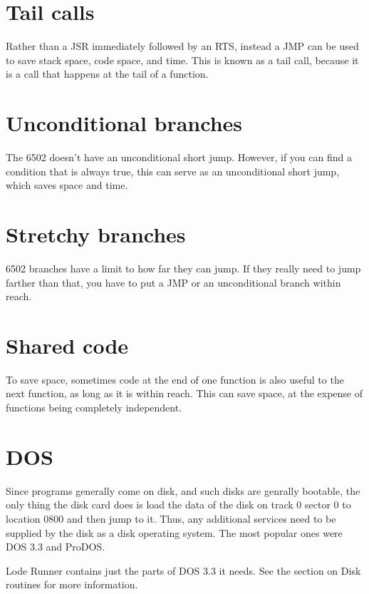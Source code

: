 \documentclass[10pt]{report}%
\begin{document}
\section{Tail calls}

Rather than a {\Tt{}JSR\nwendquote} immediately followed by an {\Tt{}RTS\nwendquote}, instead a {\Tt{}JMP\nwendquote}
can be used to save stack space, code space, and time. This is known as a
tail call, because it is a call that happens at the tail of a function.

\section{Unconditional branches}

The 6502 doesn't have an unconditional short jump. However, if you can find
a condition that is always true, this can serve as an unconditional short
jump, which saves space and time.

\section{Stretchy branches}

6502 branches have a limit to how far they can jump. If they really need to
jump farther than that, you have to put a {\Tt{}JMP\nwendquote} or an unconditional branch
within reach.

\section{Shared code}

To save space, sometimes code at the end of one function is also useful to
the next function, as long as it is within reach. This can save space, at
the expense of functions being completely independent.

\section{DOS}

Since programs generally come on disk, and such disks are genrally bootable,
the only thing the disk card does is load the data of the disk on track 0
sector 0 to location {\Tt{}0800\nwendquote} and then jump to it. Thus, any additional
services need to be supplied by the disk as a disk operating system. The most
popular ones were DOS 3.3 and ProDOS.

Lode Runner contains just the parts of DOS 3.3 it needs. See the section on
Disk routines for more information.
\end{document}
